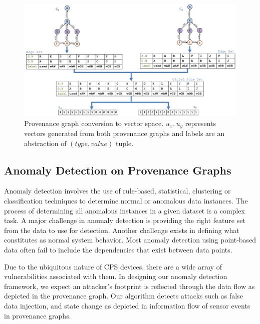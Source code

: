 \begin{figure}[h!]
\begin{center}
\includegraphics[width=\textwidth]{Picture_13_edit_5.pdf}
\end{center}
\caption{Provenance graph conversion to vector space. $u_x, u_y$ represents vectors generated from both provenance graphs and labels are an abstraction of $(type, value)$ tuple. }
\label{prov_vector}
\end{figure}

\subsection{Anomaly Detection on Provenance Graphs}
Anomaly detection involves the use of rule-based, statistical, clustering or classification techniques to determine normal or anomalous data instances. The process of determining all anomalous instances in a given dataset is a complex task. A major challenge in anomaly detection is providing the right feature set from the data to use for detection. Another challenge exists in defining what constitutes as normal system behavior. Most anomaly detection using point-based data often fail to include the dependencies that exist between data points. 

\par Due to the ubiquitous nature of CPS devices, there are a wide array of vulnerabilities associated with them. In designing our anomaly detection framework, we expect an attacker's footprint is reflected through the data flow as depicted in the provenance graph. Our algorithm detects attacks such as false data injection, and state change as depicted in information flow of sensor events in provenance graphs.

